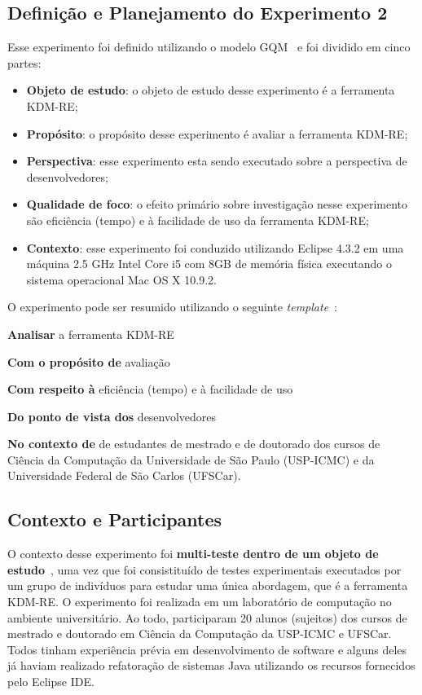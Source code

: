 \subsection{Definição e Planejamento do Experimento 2}

Esse experimento foi definido utilizando o modelo GQM~\cite{Wohlin} e foi dividido em cinco partes:

\begin{itemize}
\item \textbf{Objeto de estudo}: o objeto de estudo desse experimento é a ferramenta KDM-RE;
\item \textbf{Propósito}: o propósito desse experimento é avaliar a ferramenta KDM-RE;
\item \textbf{Perspectiva}: esse experimento esta sendo executado sobre a perspectiva de desenvolvedores;
\item \textbf{Qualidade de foco}: o efeito primário sobre investigação nesse experimento são eficiência (tempo) e à facilidade de uso da ferramenta KDM-RE;
\item \textbf{Contexto}: esse experimento foi conduzido utilizando Eclipse 4.3.2 em uma máquina 2.5 GHz Intel Core i5 com 8GB de memória física executando o sistema operacional Mac OS X 10.9.2.
\end{itemize}

O experimento pode ser resumido utilizando o seguinte \textit{template}~\cite{Wohlin}:

\textbf{Analisar} a ferramenta KDM-RE

\textbf{Com o propósito de} avaliação

\textbf{Com respeito à} eficiência (tempo) e à facilidade de uso

\textbf{Do ponto de vista dos} desenvolvedores

\textbf{No contexto de } de estudantes de mestrado e de doutorado dos cursos de Ciência da Computação da Universidade de São Paulo (USP-ICMC) e da Universidade Federal de São Carlos (UFSCar).

\subsection{Contexto e Participantes}

O contexto desse experimento foi \textbf{multi-teste dentro de um objeto de estudo}~\cite{Wohlin}, uma vez que foi consistituído de testes experimentais executados por um grupo de indivíduos para estudar uma única abordagem, que é a ferramenta KDM-RE. O experimento foi realizada em um laboratório de computação no ambiente universitário. Ao todo, participaram 20 alunos (sujeitos) dos cursos de mestrado e doutorado em Ciência da Computação da USP-ICMC e UFSCar. Todos tinham experiência prévia em desenvolvimento de software e alguns deles já haviam realizado refatoração de sistemas Java utilizando os recursos fornecidos pelo Eclipse IDE.

